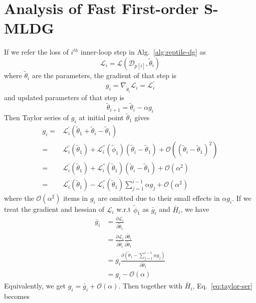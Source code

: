 \documentclass[runningheads]{llncs}
\newcommand{\nameS}{S-MLDG}
\begin{document}
\section{Analysis of Fast First-order \nameS{}\label{app-analysis-ffo}}
If we refer the loss of $i^{th}$ inner-loop step in Alg.~\ref{alg:reptile-dg} as 
\small
\begin{equation}
    \mathcal{L}_{i} =  \mathcal{L}(\mathcal{D}_{p[i]}, \tilde{\theta}_i)
\end{equation}
\normalsize
where $\tilde{\theta}_i$ are the parameters, the gradient of that step is 
\small
\begin{equation}
    g_i=\nabla_{\tilde{\theta}_i}\mathcal{L}_i=\mathcal{L}_i^{'}
\end{equation}
\normalsize
and updated parameters of that step is
\small
\begin{equation}
\tilde{\theta}_{i+1} = \tilde{\theta}_{i} - \alpha g_i
\end{equation}
\normalsize
Then Taylor series of $g_i$ at initial point $\tilde{\theta}_1$ gives 
\small
\begin{equation}
\label{eq:taylor-ser}
\begin{aligned}
g_i =& \mathcal{L}_i^{'}(\tilde{\theta}_1 + \tilde{\theta}_i - \tilde{\theta}_1)\\
=& \mathcal{L}_i^{'}(\tilde{\theta}_1) + \mathcal{L}_i^{''}(\tilde{\phi}_1)(\tilde{\theta}_i - \tilde{\theta}_1) + \mathcal{O}((\tilde{\theta}_i - \tilde{\theta}_1)^2) \\
= & \mathcal{L}_i^{'}(\tilde{\theta}_1) + \mathcal{L}_i^{''}(\tilde{\theta}_1)(\tilde{\theta}_i - \tilde{\theta}_1) + \mathcal{O}(\alpha^2) \\
= & \mathcal{L}_i^{'}(\tilde{\theta}_1) - \mathcal{L}_i^{''}(\tilde{\theta}_1)\sum_{j=1}^{i-1}\alpha g_j + \mathcal{O}(\alpha^2)
\end{aligned}
\end{equation}
\normalsize
where the $\mathcal{O}(\alpha^2)$ items in $g_i$ are omitted due to their small effects in $\alpha g_i$. If we treat the gradient and hessian of $\mathcal{L}_i$ w.r.t $\tilde{\phi}_1$ as $\bar{g}_i$ and $\bar{H}_i$, we have 
\small
\begin{equation}
\begin{aligned}
\bar{g}_i &= \frac{\partial \mathcal{L}_i}{\partial \tilde{\theta}_1}\\ & = \frac{\partial \mathcal{L}_i}{\partial \tilde{\theta}_i} \frac{\partial \tilde{\theta}_i}{\partial \tilde{\theta}_1} \\
          &= g_i \frac{\partial (\tilde{\theta}_1 - \sum_{j=1}^{i-1}\alpha g_j)}{\partial \tilde{\theta}_1} \\
          &= g_i - \mathcal{O}(\alpha)
\end{aligned}
\end{equation}
\normalsize
Equivalently, we get $g_i = \bar{g}_i + \mathcal{O}(\alpha)$. Then together with $\bar{H}_i$, Eq.~\ref{eq:taylor-ser} becomes
\end{document}
